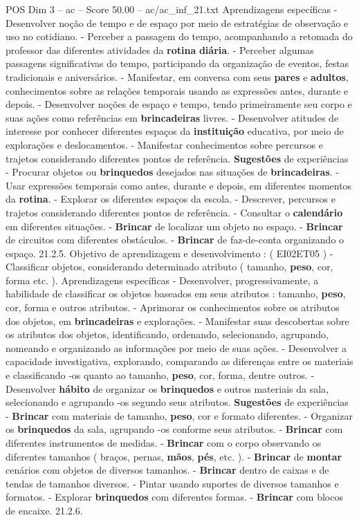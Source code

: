 \begin{textsample}{POS Dim 3 – ac – Score 50.00 – ac/ac\_inf\_21.txt}
Aprendizagens específicas - Desenvolver noção de tempo e de espaço por meio de estratégias de observação e uso no cotidiano. - Perceber a passagem do tempo, acompanhando a retomada do professor das diferentes atividades da \textbf{rotina} \textbf{diária}. - Perceber algumas passagens significativas do tempo, participando da organização de eventos, festas tradicionais e aniversários. - Manifestar, em conversa com seus \textbf{pares} e \textbf{adultos}, conhecimentos sobre as relações temporais usando as expressões antes, durante e depois. - Desenvolver noções de espaço e tempo, tendo primeiramente seu corpo e suas ações como referências em \textbf{brincadeiras} livres. - Desenvolver atitudes de interesse por conhecer diferentes espaços da \textbf{instituição} educativa, por meio de explorações e deslocamentos. - Manifestar conhecimentos sobre percursos e trajetos considerando diferentes pontos de referência. \textbf{Sugestões} de experiências - Procurar objetos ou \textbf{brinquedos} desejados nas situações de \textbf{brincadeiras}. - Usar expressões temporais como antes, durante e depois, em diferentes momentos da \textbf{rotina}. - Explorar os diferentes espaços da escola. - Descrever, percursos e trajetos considerando diferentes pontos de referência. - Consultar o \textbf{calendário} em diferentes situações. - \textbf{Brincar} de localizar um objeto no espaço. - \textbf{Brincar} de circuitos com diferentes obstáculos. - \textbf{Brincar} de faz-de-conta organizando o espaço. 21.2.5.
Objetivo de aprendizagem e desenvolvimento : ( EI02ET05 ) - Classificar objetos, considerando determinado atributo ( tamanho, \textbf{peso}, cor, forma etc. ).
Aprendizagens específicas - Desenvolver, progressivamente, a habilidade de classificar os objetos baseados em seus atributos : tamanho, \textbf{peso}, cor, forma e outros atributos. - Aprimorar os conhecimentos sobre os atributos dos objetos, em \textbf{brincadeiras} e explorações. - Manifestar suas descobertas sobre os atributos dos objetos, identificando, ordenando, selecionando, agrupando, nomeando e organizando as informações por meio de suas ações. - Desenvolver a capacidade investigativa, explorando, comparando as diferenças entre os materiais e classificando -os quanto ao tamanho, \textbf{peso}, cor, forma, dentre outros. - Desenvolver \textbf{hábito} de organizar os \textbf{brinquedos} e outros materiais da sala, selecionando e agrupando -os segundo seus atributos. \textbf{Sugestões} de experiências - \textbf{Brincar} com materiais de tamanho, \textbf{peso}, cor e formato diferentes. - Organizar os \textbf{brinquedos} da sala, agrupando -os conforme seus atributos. - \textbf{Brincar} com diferentes instrumentos de medidas. - \textbf{Brincar} com o corpo observando os diferentes tamanhos ( braços, pernas, \textbf{mãos}, \textbf{pés}, etc. ). - \textbf{Brincar} de \textbf{montar} cenários com objetos de diversos tamanhos. - \textbf{Brincar} dentro de caixas e de tendas de tamanhos diversos. - Pintar usando suportes de diversos tamanhos e formatos. - Explorar \textbf{brinquedos} com diferentes formas. - \textbf{Brincar} com blocos de encaixe. 21.2.6.

\end{textsample}
